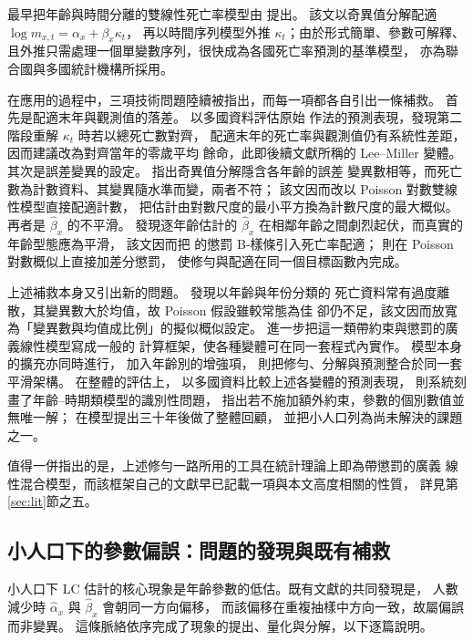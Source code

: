 \documentclass[UTF8, fontset=macnew, a4paper, 12pt]{ctexart}
\begin{document}
最早把年齡與時間分離的雙線性死亡率模型由 \citet{lee1992} 提出。
該文以奇異值分解配適 $\log m_{x,t}=\alpha_x+\beta_x\kappa_t$，
再以時間序列模型外推 $\kappa_t$；由於形式簡單、參數可解釋、
且外推只需處理一個單變數序列，很快成為各國死亡率預測的基準模型，
亦為聯合國與多國統計機構所採用。

在應用的過程中，三項技術問題陸續被指出，而每一項都各自引出一條補救。
首先是配適末年與觀測值的落差。\citet{leemiller2001} 以多國資料評估原始
作法的預測表現，發現第二階段重解 $\kappa_t$ 時若以總死亡數對齊，
配適末年的死亡率與觀測值仍有系統性差距，因而建議改為對齊當年的零歲平均
餘命，此即後續文獻所稱的 Lee--Miller 變體。
其次是誤差變異的設定。\citet{brouhns2002} 指出奇異值分解隱含各年齡的誤差
變異數相等，而死亡數為計數資料、其變異隨水準而變，兩者不符；
該文因而改以 Poisson 對數雙線性模型直接配適計數，
把估計由對數尺度的最小平方換為計數尺度的最大概似。
再者是 $\hat\beta_x$ 的不平滑。\citet{currie2004} 發現逐年齡估計的
$\hat\beta_x$ 在相鄰年齡之間劇烈起伏，而真實的年齡型態應為平滑，
該文因而把 \citet{eilers1996} 的懲罰 B-樣條引入死亡率配適；
\citet{delwarde2007} 則在 Poisson 對數概似上直接加差分懲罰，
使修勻與配適在同一個目標函數內完成。

上述補救本身又引出新的問題。\citet{djeundje2010} 發現以年齡與年份分類的
死亡資料常有過度離散，其變異數大於均值，故 Poisson 假設雖較常態為佳
卻仍不足，該文因而放寬為「變異數與均值成比例」的擬似概似設定。
\citet{currie2013} 進一步把這一類帶約束與懲罰的廣義線性模型寫成一般的
計算框架，使各種變體可在同一套程式內實作。
模型本身的擴充亦同時進行，\citet{renshaw2003} 加入年齡別的增強項，
\citet{camarda2021} 則把修勻、分解與預測整合於同一套平滑架構。
在整體的評估上，\citet{booth2006} 以多國資料比較上述各變體的預測表現，
\citet{hunt2020} 則系統刻畫了年齡--時期類模型的識別性問題，
指出若不施加額外約束，參數的個別數值並無唯一解；
\citet{basellini2023} 在模型提出三十年後做了整體回顧，
並把小人口列為尚未解決的課題之一。

值得一併指出的是，上述修勻一路所用的工具在統計理論上即為帶懲罰的廣義
線性混合模型，而該框架自己的文獻早已記載一項與本文高度相關的性質，
詳見第\ref{sec:lit}節之五。

\subsection{小人口下的參數偏誤：問題的發現與既有補救}

小人口下 LC 估計的核心現象是年齡參數的低估。既有文獻的共同發現是，
人數減少時 $\hat\alpha_x$ 與 $\hat\beta_x$ 會朝同一方向偏移，
而該偏移在重複抽樣中方向一致，故屬偏誤而非變異。
這條脈絡依序完成了現象的提出、量化與分解，以下逐篇說明。
\end{document}
